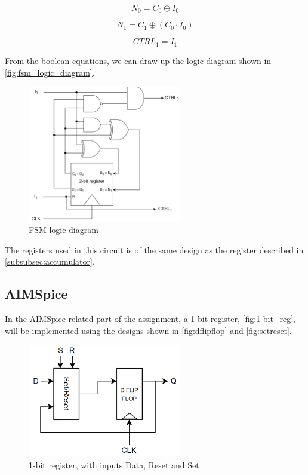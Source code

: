 \begin{equation}
\label{eq:comb_eq_2}
    N_0 = C_0 \oplus I_0
\end{equation}

\begin{equation}
\label{eq:comb_eq_3}
    N_1 = C_1 \oplus (C_0 \cdot I_0)
\end{equation}

\begin{equation}
\label{eq:comb_eq_4}
    CTRL_1 = I_1
\end{equation}

From the boolean equations, we can draw up the logic diagram shown in \autoref{fig:fsm_logic_diagram}.

\begin{figure}[H]
    \centering
    \includegraphics[width=0.6\textwidth]{Figures/logic diagram.png}
    \caption{FSM logic diagram}
    \label{fig:fsm_logic_diagram}
\end{figure}

\noindent
The registers used in this circuit is of the same design as the register described in \autoref{subsubsec:accumulator}.

\subsection{AIMSpice}
\label{subsec:aimspicemethod}

In the AIMSpice related part of the assignment, a 1 bit register, \autoref{fig:1-bit_reg}, will be implemented using the designs shown in \autoref{fig:dflipflop} and \ref{fig:setreset}.

\begin{figure}[H]
    \centering
    \includegraphics[width=0.6\textwidth]{Figures/1-bit register.png}
    \caption{1-bit register, with inputs Data, Reset and Set}
    \label{fig:1-bit_reg}
\end{figure}

